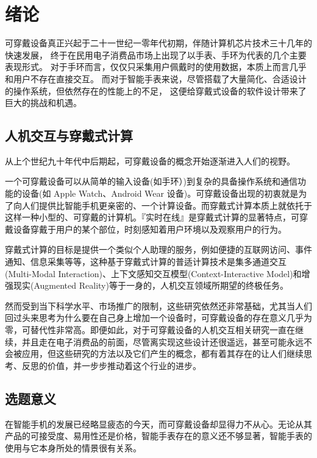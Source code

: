 \chapter{绪论}

可穿戴设备真正兴起于二十一世纪一零年代初期，伴随计算机芯片技术三十几年的快速发展，
终于在民用电子消费品市场上出现了以手表、手环为代表的几个主要表现形式。
对于手环而言，仅仅只采集用户佩戴时的使用数据，本质上而言几乎和用户不存在直接交互。
而对于智能手表来说，尽管搭载了大量简化、合适设计的操作系统，但依然存在的性能上的不足，
这便给穿戴式设备的软件设计带来了巨大的挑战和机遇\cite{DBLP:journals/corr/JiangCZZKZ15}。

\section{人机交互与穿戴式计算}

从上个世纪九十年代中后期起，可穿戴设备的概念开始逐渐进入人们的视野。

一个可穿戴设备可以从简单的输入设备(如手环）)到复杂的具备操作系统和通信功能的设备(如 Apple Watch、Android Wear 设备)。可穿戴设备出现的初衷就是为了向人们提供比智能手机更亲密的、一个计算设备。而穿戴式计算本质上就依托于这样一种小型的、可穿戴的计算机。『实时在线』是穿戴式计算的显著特点，可穿戴设备穿戴于用户的某个部位，时刻感知着用户环境以及观察用户的行为。

穿戴式计算的目标是提供一个类似个人助理的服务，例如便捷的互联网访问、事件通知、信息采集等等，这种基于穿戴式计算的普适计算技术是集多通道交互(Multi-Modal Interaction)、上下文感知交互模型(Context-Interactive Model)和增强现实(Augmented Reality)等于一身的，人机交互领域所期望的终极任务\cite{dongshihai2004,yuweining2004}。

然而受到当下科学水平、市场推广的限制，这些研究依然还非常基础，尤其当人们回过头来思考为什么要在自己身上增加一个设备时，可穿戴设备的存在意义几乎为零，可替代性非常高。即便如此，对于可穿戴设备的人机交互相关研究一直在继续，并且走在电子消费品的前面，尽管离实现这些设计还很遥远，甚至可能永远不会被应用，但这些研究的方法以及它们产生的概念，都有着其存在的让人们继续思考、反思的价值\cite{hudson2014concepts}，并一步步推动着这个行业的进步。

\section{选题意义}

在智能手机的发展已经略显疲态的今天，而可穿戴设备却显得力不从心。无论从其产品的可接受度、易用性还是价格，智能手表存在的意义还不够显著，智能手表的使用与它本身所处的情景很有关系\cite{zhuzijian2015}。

